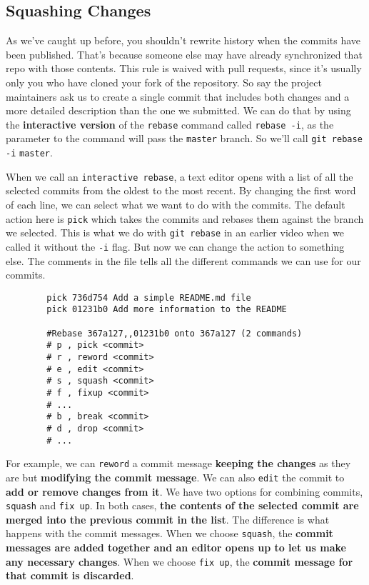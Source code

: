 	\subsection{Squashing Changes}
	
	
	As we've caught up before, you shouldn't rewrite history when the commits have been published. That's because someone else may have already synchronized that repo with those contents. This rule is waived with pull requests, since it's usually only you who have cloned your fork of the repository. So say the project maintainers ask us to create a single commit that includes both changes and a more detailed description than the one we submitted. We can do that by using the \textbf{interactive version} of the \texttt{rebase} command called \verb|rebase -i|, as the parameter to the command will pass the \texttt{master} branch. So we'll call \texttt{git rebase} \verb|-i| \texttt{master}.
	
	When we call an \texttt{interactive rebase}, a text editor opens with a list of all the selected commits from the oldest to the most recent. By changing the first word of each line, we can select what we want to do with the commits. The default action here is \texttt{pick} which takes the commits and rebases them against the branch we selected. 
	This is what we do with \texttt{git rebase} in an earlier video when we called it without the \verb|-i| flag. But now we can change the action to something else. The comments in the file tells all the different commands we can use for our commits. 
	
	\begin{verbatim}
		pick 736d754 Add a simple README.md file
		pick 01231b0 Add more information to the README
		
		#Rebase 367a127,,01231b0 onto 367a127 (2 commands)
		# p , pick <commit>
		# r , reword <commit>
		# e , edit <commit>
		# s , squash <commit>
		# f , fixup <commit>
		# ...
		# b , break <commit>
		# d , drop <commit>
		# ...
	\end{verbatim}
	
	
	For example, we can \texttt{reword} a commit message\textbf{ keeping the changes} as they are but\textbf{ modifying the commit message}. We can also \texttt{edit} the commit to \textbf{add or remove changes from it}. 
	We have two options for combining commits, \texttt{squash} and \texttt{fix up}. In both cases, \textbf{the contents of the selected commit are merged into the previous commit in the list}. The difference is what happens with the commit messages. When we choose \texttt{squash}, the \textbf{commit messages are added together and an editor opens up to let us make any necessary changes}. When we choose \texttt{fix up}, the \textbf{commit message for that commit is discarded}. 
	
